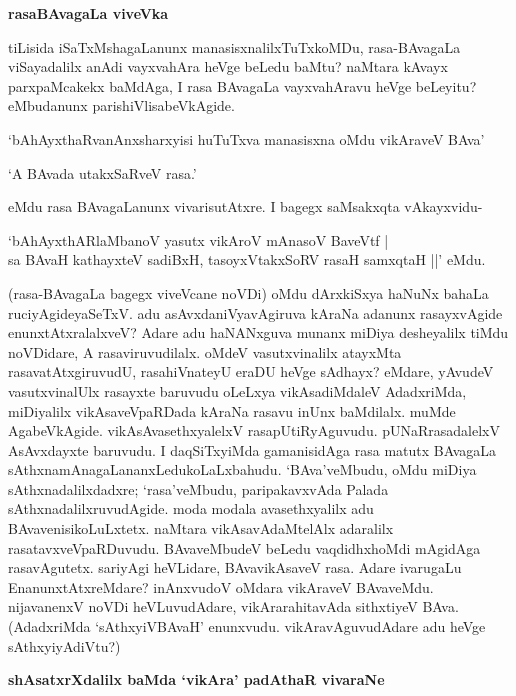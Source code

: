 \noindent
{\bf\large{rasaBAvagaLa viveVka}}\label{page224}

tiLisida iSaTxMshagaLanunx manasisxnalilxTuTxkoMDu, rasa-BAvagaLa viSayadalilx anAdi vayxvahAra heVge beLedu baMtu? naMtara kAvayx parxpaMcakekx baMdAga, I rasa BAvagaLa vayxvahAravu heVge beLeyitu? eMbudanunx parishiVlisabeVkAgide.

`bAhAyxthaRvanAnxsharxyisi huTuTxva manasisxna oMdu vikAraveV BAva'

`A BAvada utakxSaRveV rasa.'

eMdu rasa BAvagaLanunx vivarisutAtxre. I bagegx saMsakxqta vAkayxvidu-

\begin{shloka}
`bAhAyxthARlaMbanoV yasutx vikAroV mAnasoV BaveVtf |\\\label{225}
sa BAvaH kathayxteV sadiBxH, tasoyxVtakxSoRV rasaH samxqtaH ||' eMdu.
\end{shloka}

(rasa-BAvagaLa bagegx viveVcane noVDi) oMdu dArxkiSxya haNuNx bahaLa ruciyAgideyaSeTxV. adu asAvxdaniVyavAgiruva kAraNa adanunx rasayxvAgide enunxtAtxralalxveV? Adare adu haNANxguva munanx miDiya desheyalilx tiMdu noVDidare, A rasaviruvudilalx. oMdeV vasutxvinalilx atayxMta rasavatAtxgiruvudU, rasahiVnateyU eraDU heVge sAdhayx? eMdare, yAvudeV vasutxvinalUlx rasayxte baruvudu oLeLxya vikAsadiMdaleV AdadxriMda, miDiyalilx vikAsaveVpaRDada kAraNa rasavu inUnx baMdilalx. muMde AgabeVkAgide. vikAsAvasethxyalelxV rasapUtiRyAguvudu. pUNaRrasadalelxV AsAvxdayxte baruvudu. I daqSiTxyiMda gamanisidAga rasa matutx BAvagaLa sAthxnamAnagaLananxLedukoLaLxbahudu. `BAva'veMbudu, oMdu miDiya sAthxnadalilxdadxre; `rasa'veMbudu, paripakavxvAda Palada sAthxnadalilxruvudAgide. moda modala avasethxyalilx adu BAvavenisikoLuLxtetx. naMtara vikAsavAdaMtelAlx adaralilx rasatavxveVpaRDuvudu. BAvaveMbudeV beLedu vaqdidhxhoMdi mAgidAga rasavAgutetx. sariyAgi heVLidare, BAvavikAsaveV rasa. Adare ivarugaLu EnanunxtAtxreMdare? inAnxvudoV oMdara vikAraveV BAvaveMdu. nijavanenxV noVDi heVLuvudAdare, vikArarahitavAda sithxtiyeV BAva. (AdadxriMda `sAthxyiVBAvaH' enunxvudu. vikAravAguvudAdare adu heVge sAthxyiyAdiVtu?)

\noindent
{\bf\large{shAsatxrXdalilx baMda `vikAra' padAthaR vivaraNe}}\label{page225}

